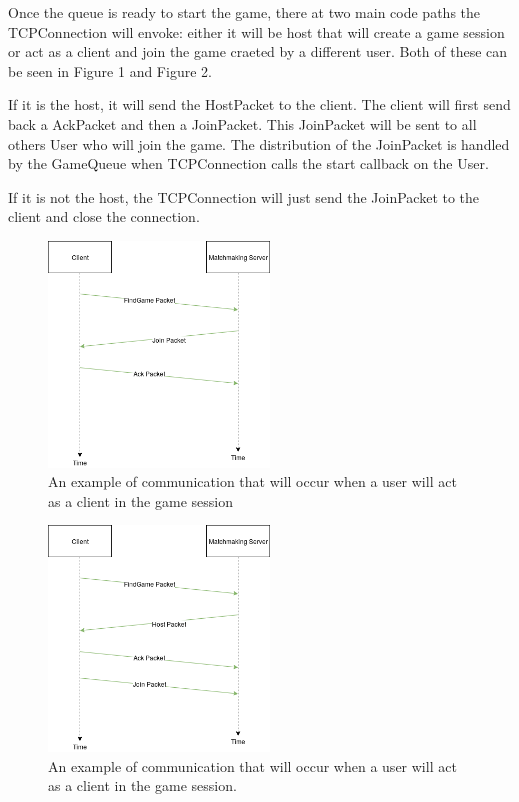\documentclass[conference]{IEEEtran}
\begin{document}
Once the queue is ready to start the game, there at two main code paths the TCPConnection will envoke: either it will be host that will create a game session or act as a client and join the game craeted by a different user.
Both of these can be seen in Figure 1 and Figure 2.

If it is the host, it will send the HostPacket to the client.
The client will first send back a AckPacket and then a JoinPacket.
This JoinPacket will be sent to all others User who will join the game.
The distribution of the JoinPacket is handled by the GameQueue when TCPConnection calls the start callback on the User.

If it is not the host, the TCPConnection will just send the JoinPacket to the client and close the connection.

\begin{figure}[h]
\centerline{\includegraphics[width=\linewidth, height=6cm]{figures/ClientCommunication.png}}
\caption{An example of communication that will occur when a user will act as a client in the game session }
\label{fig}
\end{figure}

\begin{figure}[h]
\centerline{\includegraphics[width=\linewidth, height=6cm]{figures/HostCommunication.png}}
\caption{An example of communication that will occur when a user will act as a client in the game session. }
\label{fig}
\end{figure}
\end{document}
